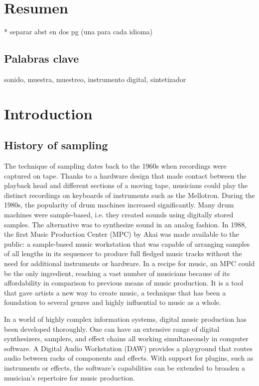 \documentclass[12pt , a4paper]{article}
\begin{document}
	\section{Resumen}
	* separar abst en dos pg (una para cada idioma)
	
	\subsection{Palabras clave}
	sonido, muestra, muestreo, instrumento digital, sintetizador
	


	\newpage
	\section{Introduction}
	\subsection{History of sampling}
	
	The technique of sampling dates back to the 1960s when recordings were captured on tape. Thanks to a hardware design that made contact between the playback head and different sections of a moving tape, musicians could play the distinct recordings on keyboards of instruments such as the Mellotron. During the 1980s, the popularity of drum machines increased significantly. Many drum machines were sample-based, i.e. they created sounds using digitally stored samples. The alternative was to synthesize sound in an analog fashion. In 1988, the first Music Production Center (MPC) by Akai was made available to the public: a sample-based music workstation that was capable of arranging samples of all lengths in its sequencer to produce full fledged music tracks without the need for additional instruments or hardware. In a recipe for music, an MPC could be the only ingredient, reaching a vast number of musicians because of its affordability in comparison to previous means of music production. It is a tool that gave artists a new way to create music, a technique that has been a foundation to several genres and highly influential to music as a whole.
	\par	
	In a world of highly complex information systems, digital music production has been developed thoroughly. One can have an extensive range of digital synthesizers, samplers, and effect chains all working simultaneously in computer software. A Digital Audio Workstation (DAW) provides a playground that routes audio between racks of components and effects. With support for plugins, such as instruments or effects, the software's capabilities can be extended to broaden a musician's repertoire for music production. 
	
\end{document}
